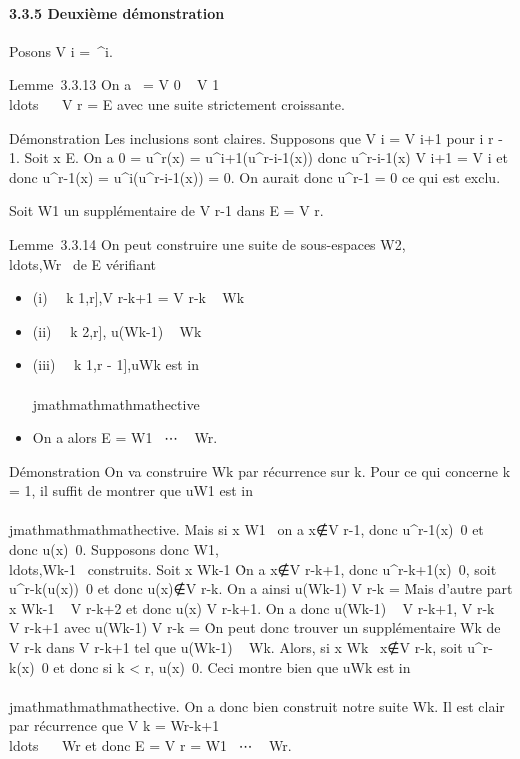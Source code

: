 \paragraph{3.3.5 Deuxième démonstration}

Posons V i =\
\mathrmKeru^i.

Lemme~3.3.13 On a \0\ = V 0
\subset~ V 1
\subset~\\ldots~ \subset~ V
r = E avec une suite strictement croissante.

Démonstration Les inclusions sont claires. Supposons que V i =
V i+1 pour i \leq r - 1. Soit x \in E. On a 0 = u^r(x) =
u^i+1(u^r-i-1(x)) donc u^r-i-1(x) \in V
i+1 = V i et donc u^r-1(x) =
u^i(u^r-i-1(x)) = 0. On aurait donc
u^r-1 = 0 ce qui est exclu.

Soit W1 un supplémentaire de V r-1 dans E = V
r.

Lemme~3.3.14 On peut construire une suite de sous-espaces
W2,\\ldots,Wr~
de E vérifiant

\begin{itemize}
\itemsep1pt\parskip0pt
\item
  (i) \forall~~k \in {[}1,r{]},\quad V
  r-k+1 = V r-k \oplus~ Wk
\item
  (ii) \forall~~k \in {[}2,r{]},\quad
  u(Wk-1) \subset~ Wk
\item
  (iii) \forall~~k \in {[}1,r -
  1{]},\quad u\textbar{}Wk est
  in\\\\jmathmathmathmathective
\item
  On a alors E = W1 \oplus~⋯ \oplus~
  Wr.
\end{itemize}

Démonstration On va construire Wk par récurrence sur k. Pour
ce qui concerne k = 1, il suffit de montrer que
u\textbar{}W1 est in\\\\jmathmathmathmathective. Mais si x \in
W1 \diagdown\0\, on a
x∉V r-1, donc
u^r-1(x)\neq~0 et donc
u(x)\neq~0. Supposons donc
W1,\\ldots,Wk-1~
construits. Soit x \in Wk-1
\diagdown\0\. On a
x∉V r-k+1, donc
u^r-k+1(x)\neq~0, soit
u^r-k(u(x))\neq~0 et donc
u(x)∉V r-k. On a ainsi
u(Wk-1) \bigcap V r-k =
\0\. Mais d'autre part x \in
Wk-1 \subset~ V r-k+2 et donc u(x) \in V r-k+1. On
a donc u(Wk-1) \subset~ V r-k+1, V r-k \subset~ V
r-k+1 avec u(Wk-1) \bigcap V r-k =
\0\. On peut donc trouver un
supplémentaire Wk de V r-k dans V r-k+1
tel que u(Wk-1) \subset~ Wk. Alors, si x \in Wk
\diagdown\0\, x∉V
r-k, soit u^r-k(x)\neq~0 et
donc si k \textless{} r, u(x)\neq~0. Ceci montre
bien que u\textbar{}Wk est in\\\\jmathmathmathmathective. On a donc bien
construit notre suite Wk. Il est clair par récurrence que V
k = Wr-k+1
\oplus~\\ldots~ \oplus~
Wr et donc E = V r = W1
\oplus~⋯ \oplus~ Wr.

